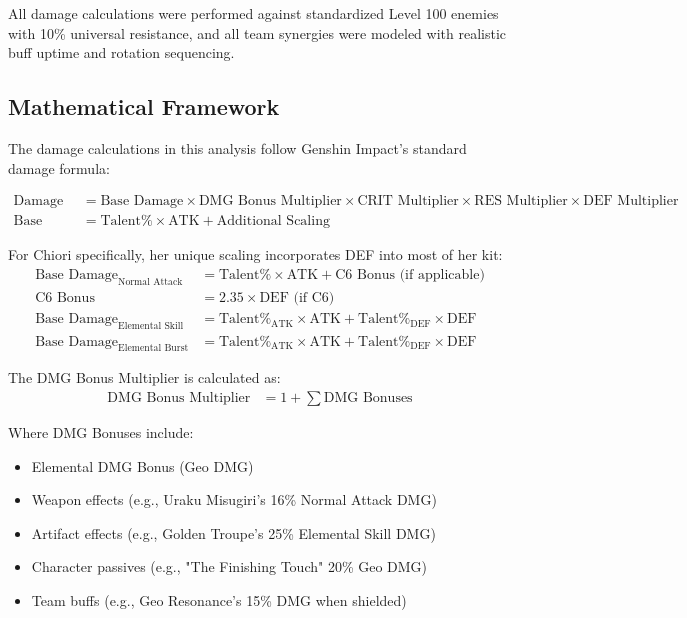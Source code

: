 \documentclass[12pt,a4paper]{article}
\begin{document}
All damage calculations were performed against standardized Level 100 enemies with 10\% universal resistance, and all team synergies were modeled with realistic buff uptime and rotation sequencing.

\subsection{Mathematical Framework}
\label{subsec:mathematical_framework}

The damage calculations in this analysis follow Genshin Impact's standard damage formula:

\begin{align}
\text{Damage} &= \text{Base Damage} \times \text{DMG Bonus Multiplier} \times \text{CRIT Multiplier} \times \text{RES Multiplier} \times \text{DEF Multiplier} \\
\text{Base Damage} &= \text{Talent\%} \times \text{ATK} + \text{Additional Scaling}
\end{align}

For Chiori specifically, her unique scaling incorporates DEF into most of her kit:
\begin{align}
\text{Base Damage}_{\text{Normal Attack}} &= \text{Talent\%} \times \text{ATK} + \text{C6 Bonus (if applicable)} \\
\text{C6 Bonus} &= 2.35 \times \text{DEF (if C6)} \\
\text{Base Damage}_{\text{Elemental Skill}} &= \text{Talent\%}_{\text{ATK}} \times \text{ATK} + \text{Talent\%}_{\text{DEF}} \times \text{DEF} \\
\text{Base Damage}_{\text{Elemental Burst}} &= \text{Talent\%}_{\text{ATK}} \times \text{ATK} + \text{Talent\%}_{\text{DEF}} \times \text{DEF}
\end{align}

The DMG Bonus Multiplier is calculated as:
\begin{align}
\text{DMG Bonus Multiplier} &= 1 + \sum \text{DMG Bonuses}
\end{align}

Where DMG Bonuses include:
\begin{itemize}
    \item Elemental DMG Bonus (Geo DMG)
    \item Weapon effects (e.g., Uraku Misugiri's 16\% Normal Attack DMG)
    \item Artifact effects (e.g., Golden Troupe's 25\% Elemental Skill DMG)
    \item Character passives (e.g., "The Finishing Touch" 20\% Geo DMG)
    \item Team buffs (e.g., Geo Resonance's 15\% DMG when shielded)
\end{itemize}
\end{document}
